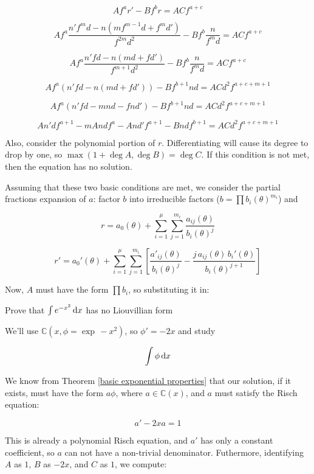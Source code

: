 $$A f^a r' - B f^b r = A C f^{a+c}$$

$$A f^a \frac{n' f^m d - n(m f^{m-1} d + f^m d')}{f^{2m} d^2} - B f^b \frac{n}{f^m d} = A C f^{a+c}$$

$$A f^a \frac{n' f d - n(m d + f d')}{f^{m+1} d^2} - B f^b \frac{n}{f^m d} = A C f^{a+c}$$

$$A f^a (n' f d - n(m d + f d')) - B f^{b+1} n d = A C d^2 f^{a+c+m+1} $$

$$A f^a (n' f d - m n d - f n d') - B f^{b+1} n d = A C d^2 f^{a+c+m+1} $$

$$A n' d f^{a+1} - m A n d f^a - A n d' f^{a+1} - B n d f^{b+1} = A C d^2 f^{a+c+m+1} $$




Also, consider the polynomial portion of $r$.  Differentiating
will cause its degree to drop by one, so $\max(1 + \deg A, \deg B) = \deg C$.
If this condition is not met, then the equation has no solution.

Assuming that these two basic conditions are met, we consider 
the partial fractions expansion of $a$:
factor $b$ into irreducible factors ($b=\prod b_i(\theta)^{m_i}$) and

$$r = a_0(\theta) + \sum_{i=1}^\mu \sum_{j=1}^{m_i} \frac{a_{ij}(\theta)}{b_i(\theta)^j}$$

$$r' = a_0'(\theta) + \sum_{i=1}^\mu \sum_{j=1}^{m_i} \left[
\frac{a'_{ij}(\theta)}{b_i(\theta)^j} - \frac{j\, a_{ij}(\theta)\,
b_i'(\theta)}{b_i(\theta)^{j+1}} \right]$$

Now, $A$ must have the form $\prod b_i$, so substituting it in:


\example Prove that $\int e^{-x^2}\, {\rm d}x$ has no Liouvillian form

We'll use ${\mathbb C}(x, \phi = \exp\, -x^2)$, so $\phi' = -2x$ and
study

$$\int \phi \, {\rm d}x$$

We know from Theorem \ref{basic exponential properties} that our
solution, if it exists, must have the form $a\phi$, where $a \in
{\mathbb C}(x)$, and $a$ must satisfy the Risch equation:

$$a' - 2x a = 1$$

This is already a polynomial Risch equation, and $a'$ has only
a constant coefficient, so $a$ can not have a non-trivial denominator.
Futhermore, identifying $A$ as $1$, $B$ as $-2x$, and $C$ as $1$, we compute:

